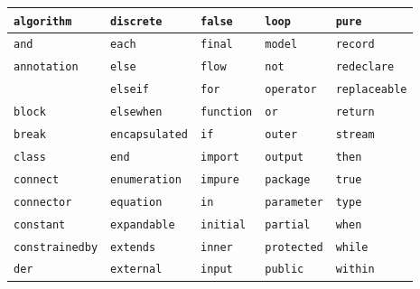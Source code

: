 \begin{longtable}[c]{@{}lllll@{}}
\lstinline[basicstyle=\ttfamily]!algorithm! & \lstinline[basicstyle=\ttfamily]!discrete! & \lstinline[basicstyle=\ttfamily]!false! & \lstinline[basicstyle=\ttfamily]!loop! & \lstinline[basicstyle=\ttfamily]!pure!\\ \hline
\lstinline[basicstyle=\ttfamily]!and! & \lstinline[basicstyle=\ttfamily]!each! & \lstinline[basicstyle=\ttfamily]!final! & \lstinline[basicstyle=\ttfamily]!model! & \lstinline[basicstyle=\ttfamily]!record!\\ \hline
\lstinline[basicstyle=\ttfamily]!annotation! & \lstinline[basicstyle=\ttfamily]!else! & \lstinline[basicstyle=\ttfamily]!flow! & \lstinline[basicstyle=\ttfamily]!not! & \lstinline[basicstyle=\ttfamily]!redeclare!\\ \hline
& \lstinline[basicstyle=\ttfamily]!elseif! & \lstinline[basicstyle=\ttfamily]!for! & \lstinline[basicstyle=\ttfamily]!operator! & \lstinline[basicstyle=\ttfamily]!replaceable!\\ \hline
\lstinline[basicstyle=\ttfamily]!block! & \lstinline[basicstyle=\ttfamily]!elsewhen! & \lstinline[basicstyle=\ttfamily]!function! & \lstinline[basicstyle=\ttfamily]!or! & \lstinline[basicstyle=\ttfamily]!return!\\ \hline
\lstinline[basicstyle=\ttfamily]!break! & \lstinline[basicstyle=\ttfamily]!encapsulated! & \lstinline[basicstyle=\ttfamily]!if! & \lstinline[basicstyle=\ttfamily]!outer! & \lstinline[basicstyle=\ttfamily]!stream!\\ \hline
\lstinline[basicstyle=\ttfamily]!class! & \lstinline[basicstyle=\ttfamily]!end! & \lstinline[basicstyle=\ttfamily]!import! & \lstinline[basicstyle=\ttfamily]!output! & \lstinline[basicstyle=\ttfamily]!then!\\ \hline
\lstinline[basicstyle=\ttfamily]!connect! & \lstinline[basicstyle=\ttfamily]!enumeration! & \lstinline[basicstyle=\ttfamily]!impure! & \lstinline[basicstyle=\ttfamily]!package! & \lstinline[basicstyle=\ttfamily]!true!\\ \hline
\lstinline[basicstyle=\ttfamily]!connector! & \lstinline[basicstyle=\ttfamily]!equation! & \lstinline[basicstyle=\ttfamily]!in! & \lstinline[basicstyle=\ttfamily]!parameter! & \lstinline[basicstyle=\ttfamily]!type!\\ \hline
\lstinline[basicstyle=\ttfamily]!constant! & \lstinline[basicstyle=\ttfamily]!expandable! & \lstinline[basicstyle=\ttfamily]!initial! & \lstinline[basicstyle=\ttfamily]!partial! & \lstinline[basicstyle=\ttfamily]!when!\\ \hline
\lstinline[basicstyle=\ttfamily]!constrainedby! & \lstinline[basicstyle=\ttfamily]!extends! & \lstinline[basicstyle=\ttfamily]!inner! & \lstinline[basicstyle=\ttfamily]!protected! & \lstinline[basicstyle=\ttfamily]!while!\\ \hline
\lstinline[basicstyle=\ttfamily]!der! & \lstinline[basicstyle=\ttfamily]!external! & \lstinline[basicstyle=\ttfamily]!input! & \lstinline[basicstyle=\ttfamily]!public! & \lstinline[basicstyle=\ttfamily]!within!\\ \hline
\end{longtable}


